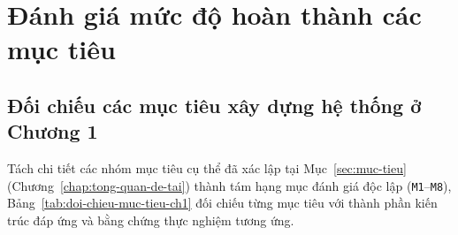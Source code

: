 \section{Đánh giá mức độ hoàn thành các mục tiêu}
\label{sec:danh-gia-muc-tieu}

\subsection{Đối chiếu các mục tiêu xây dựng hệ thống ở Chương 1}
\label{subsec:doi-chieu-muc-tieu-ch1}

Tách chi tiết các nhóm mục tiêu cụ thể đã xác lập tại Mục~\ref{sec:muc-tieu} (Chương~\ref{chap:tong-quan-de-tai}) thành tám hạng mục đánh giá độc lập (\texttt{M1}--\texttt{M8}), Bảng~\ref{tab:doi-chieu-muc-tieu-ch1} đối chiếu từng mục tiêu với thành phần kiến trúc đáp ứng và bằng chứng thực nghiệm tương ứng.

